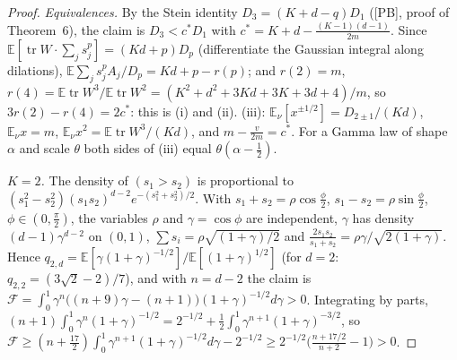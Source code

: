 \documentclass[10pt]{article}
\theoremstyle{definition}
\theoremstyle{remark}
\newcommand{\E}{\mathbb{E}}
\newcommand{\tr}{\operatorname{tr}}
\newcommand{\PB}{\textup{[PB]}}
\begin{document}
\begin{proof}
\emph{Equivalences.} By the Stein identity $D_3=(K+d-q)D_1$ (\PB, proof of Theorem~6), the claim is
$D_3<c^\ast D_1$ with $c^\ast=K+d-\frac{(K-1)(d-1)}{2m}$. Since $\E[\tr W\cdot\sum_js_j^p]=(Kd+p)D_p$ (differentiate the
Gaussian integral along dilations), $\E\sum_js_j^pA_j/D_p=Kd+p-r(p)$; and $r(2)=m$,
$r(4)=\E\tr W^3/\E\tr W^2=(K^2+d^2+3Kd+3K+3d+4)/m$, so $3r(2)-r(4)=2c^\ast$: this is (i) and (ii). (iii):
$\E_\nu[x^{\pm1/2}]=D_{2\pm1}/(Kd)$, $\E_\nu x=m$, $\E_\nu x^2=\E\tr W^3/(Kd)$, and $m-\frac v{2m}=c^\ast$. For a Gamma law
of shape $\alpha$ and scale $\theta$ both sides of (iii) equal $\theta(\alpha-\frac12)$.

\emph{$K=2$.} The density of $(s_1>s_2)$ is proportional to $(s_1^2-s_2^2)(s_1s_2)^{d-2}e^{-(s_1^2+s_2^2)/2}$. With
$s_1+s_2=\rho\cos\frac\phi2$, $s_1-s_2=\rho\sin\frac\phi2$, $\phi\in(0,\frac\pi2)$, the variables $\rho$ and
$\gamma=\cos\phi$ are independent, $\gamma$ has density $(d-1)\gamma^{d-2}$ on $(0,1)$,
$\sum s_i=\rho\sqrt{(1+\gamma)/2}$ and $\frac{2s_1s_2}{s_1+s_2}=\rho\gamma/\sqrt{2(1+\gamma)}$. Hence
$q_{2,d}=\E[\gamma(1+\gamma)^{-1/2}]/\E[(1+\gamma)^{1/2}]$ (for $d=2$: $q_{2,2}=(3\sqrt2-2)/7$), and with $n=d-2$ the claim
is $\mathcal F=\int_0^1\gamma^n\big((n+9)\gamma-(n+1)\big)(1+\gamma)^{-1/2}d\gamma>0$. Integrating by parts,
$(n+1)\int_0^1\gamma^n(1+\gamma)^{-1/2}=2^{-1/2}+\frac12\int_0^1\gamma^{n+1}(1+\gamma)^{-3/2}$, so
$\mathcal F\ge(n+\frac{17}2)\int_0^1\gamma^{n+1}(1+\gamma)^{-1/2}d\gamma-2^{-1/2}\ge2^{-1/2}\big(\frac{n+17/2}{n+2}-1\big)>0$.


\end{proof}
\end{document}

